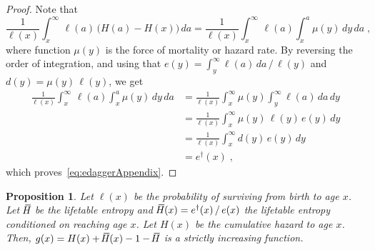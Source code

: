 \documentclass[a4paper,twoside, openright, 12pt, leqno]{article}
\newcommand*\xbar[1]{%
   \hbox{%
     \vbox{%
       \hrule height 0.5pt %
       \kern0.3ex%
       \hbox{%
         \kern-0.28em%
         \ensuremath{#1}%
         \kern-0.05em%
       }%
     }%
   }%
}
\newtheorem{theorem}{Proposition}
\begin{document}
\begin{proof}
  Note that
  $$
  \frac{1}{\ell(x)}\int_x^\infty\,\ell(a)\,\big(H(a)-H(x)\big)\,da=\frac{1}{\ell(x)}\int_x^\infty\,\ell(a)\int_x^a\mu(y)\,dy\,da\;,
  $$
  where function $\mu(y)$ is the force of mortality or hazard rate. By reversing the order of integration, and using that $e(y)=\int_y^\infty\ell(a)\,da\,/\,\ell(y)$ and $d(y)=\mu(y)\,\ell(y)$, we get
  \begin{equation*}
    \begin{split}
      \frac{1}{\ell(x)}\int_x^\infty\,\ell(a)\int_x^a\mu(y)\,dy\,da
	  & = \frac{1}{\ell(x)}\int_x^\infty\mu(y)\int_y^\infty\ell(a)\,da\,dy			\\
	  & = \frac{1}{\ell(x)}\int_x^\infty\mu(y)\,\ell(y)\,e(y)\,dy				\\			
	  & = \frac{1}{\ell(x)}\int_x^\infty d(y)\,e(y)\,dy				\\
	  & = e^\dagger(x)\;,
    \end{split}  
  \end{equation*}
  which proves~\eqref{eq:edaggerAppendix}.
\end{proof}
\medskip

\begin{theorem}
  Let $\ell(x)$ be the probability of surviving from birth to age $x$. Let $\,\xbar{H}$ be the lifetable entropy and $\,\xbar{H}(x)=e^\dagger(x)\,/\,e(x)$ the lifetable entropy conditioned on reaching age $x$. Let $H(x)$ be the cumulative hazard to age $x$. Then, $g(x)=H(x)+\,\xbar{H}(x)-1-\,\xbar{H}$ is a strictly increasing function.
 \label{prop2}
\end{theorem}
\end{document}
